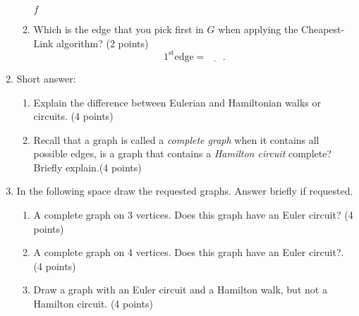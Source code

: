 \documentclass[12pt]{exam}
\begin{document}
\begin{enumerate}
\begin{enumerate}
\begin{checkboxes}
    \choice $f$
\end{checkboxes}
\vfill
\item \label{lastQnSec2} Which is the edge that you pick first in $G$ when applying the Cheapest-Link algorithm? (2 points)
$$1^{\text{st}}\text{edge}=\underline{\phantom{ans}}.$$
\vfill
\end{enumerate}
\newpage
\item Short answer:
\begin{enumerate}
    \item Explain the difference between Eulerian and Hamiltonian walks or circuits. (4 points)
    \vspace{3cm}
    \item Recall that a graph is called a \emph{complete graph} when it contains all possible edges, is a graph that contains a \emph{Hamilton circuit} complete? Briefly explain.(4 points)
    \vspace{3cm}
\end{enumerate}


\item In the following space draw the requested graphs. Answer briefly if requested.
\begin{enumerate}
    \item A complete graph on 3 vertices. Does this graph have an Euler circuit? (4 points)
    \vspace{3.5cm}
    \item A complete graph on 4 vertices. Does this graph have an Euler circuit?. (4 points)
    \vspace{3.5cm}
    \item Draw a graph with an Euler circuit and a Hamilton walk, but not a Hamilton circuit. (4 points)
    \vfill
\end{enumerate}


\end{enumerate}
\end{document}

